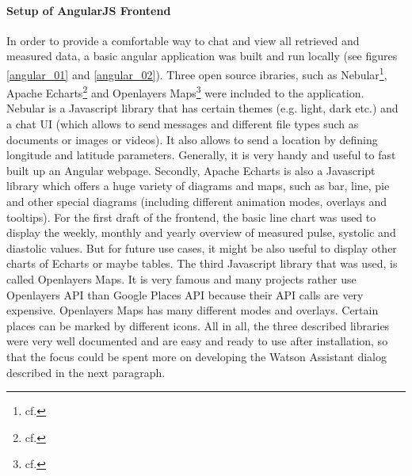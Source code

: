 \paragraph{Setup of AngularJS Frontend}

In order to provide a comfortable way to chat and view all retrieved and measured data, a basic angular application was built and run locally (see figures \ref{angular_01} and \ref{angular_02}). Three open source ibraries, such as Nebular\footnote{cf.\autocite{nebular}}, Apache Echarts\footnote{cf.\autocite{echarts}} and Openlayers Maps\footnote{cf.\autocite{openlayers}} were included to the application. Nebular is a Javascript library that has certain themes (e.g. light, dark etc.) and a chat UI (which allows to send messages and different file types such as documents or images or videos). It also allows to send a location by defining longitude and latitude parameters. Generally, it is very handy and useful to fast built up an Angular webpage.
Secondly, Apache Echarts is also a Javascript library which offers a huge variety of diagrams and maps, such as bar, line, pie and other special diagrams (including different animation modes, overlays and tooltips). For the first draft of the frontend, the basic line chart was used to display the weekly, monthly and yearly overview of measured pulse, systolic and diastolic values. But for future use cases, it might be also useful to display other charts of Echarts or maybe tables.
The third Javascript library that was used, is called Openlayers Maps. It is very famous and many projects rather use Openlayers API than Google Places API because their API calls are very expensive. Openlayers Maps has many different modes and overlays. Certain places can be marked by different icons.
All in all, the three described libraries were very well documented and are easy and ready to use after installation, so that the focus could be spent more on developing the Watson Assistant dialog described in the next paragraph.

